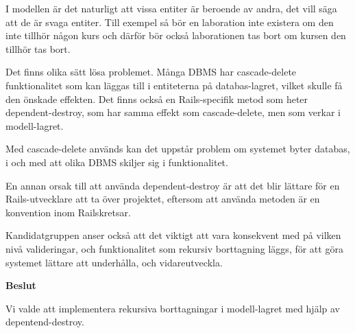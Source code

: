 I modellen är det naturligt att vissa entiter är beroende av andra, det vill säga att de är svaga entiter. Till exempel så bör en laboration inte existera om den inte tillhör någon kurs och därför bör också laborationen tas bort om kursen den tillhör tas bort. 

Det finns olika sätt lösa problemet. Många DBMS har cascade-delete funktionalitet som kan läggas till i entiteterna på databas-lagret, vilket skulle få den önskade effekten. Det finns också en Rails-specifik metod som heter dependent-destroy, som har samma effekt som cascade-delete, men som verkar i modell-lagret.

Med cascade-delete används kan det uppstår problem om systemet byter databas, i och med att olika DBMS skiljer sig i funktionalitet.

En annan orsak till att använda dependent-destroy är att det blir lättare för en Rails-utvecklare att ta över projektet, eftersom att använda metoden är en konvention inom Railskretsar.

Kandidatgruppen anser också att det viktigt att vara konsekvent med på vilken nivå valideringar, och funktionalitet som rekursiv borttagning läggs, för att göra systemet lättare att underhålla, och vidareutveckla.   

\begin{flushright}
  
  \textbf{Beslut}
  
  Vi valde att implementera rekursiva borttagningar i modell-lagret med hjälp av depentend-destroy.
\end{flushright}